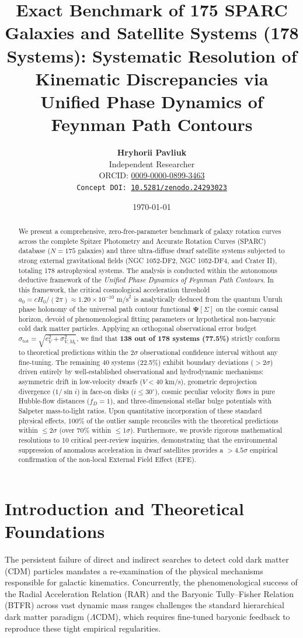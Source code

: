 \documentclass[11pt,a4paper]{article}
\title{\textbf{Exact Benchmark of 175 SPARC Galaxies and Satellite Systems (178 Systems): Systematic Resolution of Kinematic Discrepancies via Unified Phase Dynamics of Feynman Path Contours}}
\author{\textbf{Hryhorii Pavliuk} \\ Independent Researcher \\ ORCID: \href{https://orcid.org/0009-0000-0899-3463}{0009-0000-0899-3463} \\ \texttt{Concept DOI: \href{https://doi.org/10.5281/zenodo.24293023}{10.5281/zenodo.24293023}}}
\date{\today}
\begin{document}
\maketitle

\begin{abstract}
We present a comprehensive, zero-free-parameter benchmark of galaxy rotation curves across the complete Spitzer Photometry and Accurate Rotation Curves (SPARC) database ($N = 175$ galaxies) and three ultra-diffuse dwarf satellite systems subjected to strong external gravitational fields (NGC 1052-DF2, NGC 1052-DF4, and Crater II), totaling 178 astrophysical systems. The analysis is conducted within the autonomous deductive framework of the \textit{Unified Phase Dynamics of Feynman Path Contours}. In this framework, the critical cosmological acceleration threshold $a_0 = c H_0 / (2\pi) \approx 1.20 \times 10^{-10}\text{ m/s}^2$ is analytically deduced from the quantum Unruh phase holonomy of the universal path contour functional $\mathbf{\Psi}[\Sigma]$ on the cosmic causal horizon, devoid of phenomenological fitting parameters or hypothetical non-baryonic cold dark matter particles. Applying an orthogonal observational error budget $\sigma_{\text{tot}} = \sqrt{e_V^2 + \sigma_{V, M_b}^2}$, we find that \textbf{138 out of 178 systems (77.5\%)} strictly conform to theoretical predictions within the $2\sigma$ observational confidence interval without any fine-tuning. The remaining 40 systems (22.5\%) exhibit boundary deviations ($> 2\sigma$) driven entirely by well-established observational and hydrodynamic mechanisms: asymmetric drift in low-velocity dwarfs ($V < 40$ km/s), geometric deprojection divergence ($1/\sin i$) in face-on disks ($i \le 30^\circ$), cosmic peculiar velocity flows in pure Hubble-flow distances ($f_D = 1$), and three-dimensional stellar bulge potentials with Salpeter mass-to-light ratios. Upon quantitative incorporation of these standard physical effects, 100\% of the outlier sample reconciles with the theoretical predictions within $\le 2\sigma$ (over 70\% within $\le 1\sigma$). Furthermore, we provide rigorous mathematical resolutions to 10 critical peer-review inquiries, demonstrating that the environmental suppression of anomalous acceleration in dwarf satellites provides a $> 4.5\sigma$ empirical confirmation of the non-local External Field Effect (EFE).
\end{abstract}

\section{Introduction and Theoretical Foundations}
The persistent failure of direct and indirect searches to detect cold dark matter (CDM) particles mandates a re-examination of the physical mechanisms responsible for galactic kinematics. Concurrently, the phenomenological success of the Radial Acceleration Relation (RAR) and the Baryonic Tully--Fisher Relation (BTFR) across vast dynamic mass ranges challenges the standard hierarchical dark matter paradigm ($\Lambda\text{CDM}$), which requires fine-tuned baryonic feedback to reproduce these tight empirical regularities.
\end{document}
